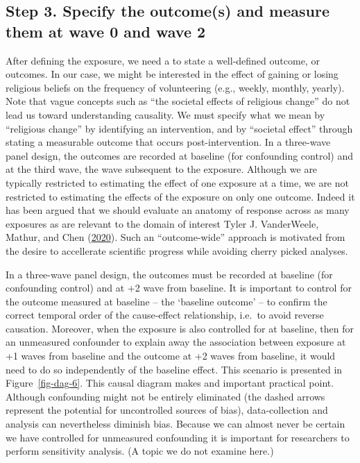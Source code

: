 \documentclass[
  singlecolumn]{report}
\begin{document}
\hypertarget{step-3.-specify-the-outcomes-and-measure-them-at-wave-0-and-wave-2}{%
\subsection{Step 3. Specify the outcome(s) and measure them at wave 0
and wave
2}\label{step-3.-specify-the-outcomes-and-measure-them-at-wave-0-and-wave-2}}

After defining the exposure, we need a to state a well-defined outcome,
or outcomes. In our case, we might be interested in the effect of
gaining or losing religious beliefs on the frequency of volunteering
(e.g., weekly, monthly, yearly). Note that vague concepts such as ``the
societal effects of religious change'' do not lead us toward
understanding causality. We must specify what we mean by ``religious
change'' by identifying an intervention, and by ``societal effect''
through stating a measurable outcome that occurs post-intervention. In a
three-wave panel design, the outcomes are recorded at baseline (for
confounding control) and at the third wave, the wave subsequent to the
exposure. Although we are typically restricted to estimating the effect
of one exposure at a time, we are not restricted to estimating the
effects of the exposure on only one outcome. Indeed it has been argued
that we should evaluate an anatomy of response across as many exposures
as are relevant to the domain of interest Tyler J. VanderWeele, Mathur,
and Chen (\protect\hyperlink{ref-vanderweele2020}{2020}). Such an
``outcome-wide'' approach is motivated from the desire to accellerate
scientific progress while avoiding cherry picked analyses.

In a three-wave panel design, the outcomes must be recorded at baseline
(for confounding control) and at +2 wave from baseline. It is important
to control for the outcome measured at baseline -- the `baseline
outcome' -- to confirm the correct temporal order of the cause-effect
relationship, i.e.~to avoid reverse causation. Moreover, when the
exposure is also controlled for at baseline, then for an unmeasured
confounder to explain away the association between exposure at +1 waves
from baseline and the outcome at +2 waves from baseline, it would need
to do so independently of the baseline effect. This scenario is
presented in Figure~\ref{fig-dag-6}. This causal diagram makes and
important practical point. Although confounding might not be entirely
eliminated (the dashed arrows represent the potential for uncontrolled
sources of bias), data-collection and analysis can nevertheless diminish
bias. Because we can almost never be certain we have controlled for
unmeasured confounding it is important for researchers to perform
sensitivity analysis. (A topic we do not examine here.)
\end{document}
